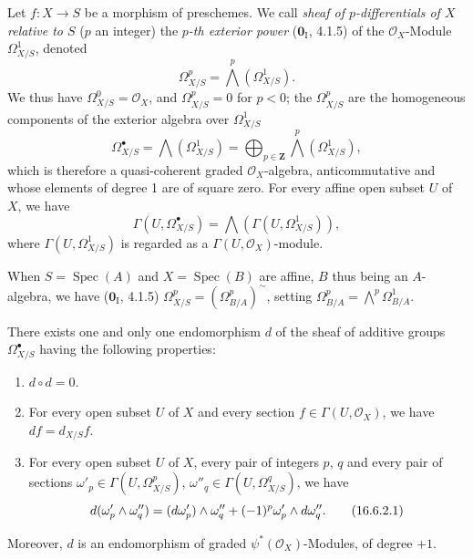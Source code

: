 \begin{env}[16.6.1]\label{IV.16.6.1}
Let $f:X\to S$ be a morphism of preschemes. We call \emph{sheaf of
$p$-differentials of $X$ relative to $S$} ($p$ an integer) the
\emph{$p$-th exterior power} ($\mathbf{0}_{\mathrm I}$, 4.1.5) of the $\mathcal{O}_X$-Module
$\varOmega_{X/S}^1$, denoted
\[
  \varOmega_{X/S}^p=\bigwedge^p(\varOmega_{X/S}^1).
  \tag{16.6.1.1}
  \label{IV.16.6.1.1}
\]
We thus have $\varOmega_{X/S}^0=\mathcal{O}_X$, and $\varOmega_{X/S}^p=0$ for $p<0$;
the $\varOmega_{X/S}^p$ are the homogeneous components of the exterior algebra
over $\varOmega_{X/S}^1$
\[
  \varOmega_{X/S}^{\bullet}=\bigwedge(\varOmega_{X/S}^1)
  =\bigoplus_{p\in\mathbf{Z}}\bigwedge^p(\varOmega_{X/S}^1),
  \tag{16.6.1.2}
  \label{IV.16.6.1.2}
\]
which is therefore a quasi-coherent graded $\mathcal{O}_X$-algebra,
anticommutative and whose elements of degree 1 are of square zero. For every
affine open subset $U$ of $X$, we have
\[
  \Gamma(U,\varOmega_{X/S}^{\bullet})
  =\bigwedge(\Gamma(U,\varOmega_{X/S}^1)),
\]
where $\Gamma(U,\varOmega_{X/S}^1)$ is regarded as a
$\Gamma(U,\mathcal{O}_X)$-module.

When $S=\operatorname{Spec}(A)$ and $X=\operatorname{Spec}(B)$ are
affine, $B$ thus being an $A$-algebra, we have ($\mathbf{0}_{\mathrm I}$, 4.1.5)
$\varOmega_{X/S}^p=(\Omega_{B/A}^p)^{\sim}$, setting
$\Omega_{B/A}^p=\bigwedge^p\Omega_{B/A}^1$.
\end{env}

\begin{theorem}[16.6.2]
\label{IV.16.6.2}
There exists one and only one endomorphism $d$ of the sheaf of additive groups
$\varOmega_{X/S}^{\bullet}$ having the following properties:
\begin{enumerate}
\item[\textup{(i)}] $d\circ d=0$.
\item[\textup{(ii)}] For every open subset $U$ of $X$ and every section
$f\in\Gamma(U,\mathcal{O}_X)$, we have $df=d_{X/S}f$.
\item[\textup{(iii)}] For every open subset $U$ of $X$, every pair of integers $p$, $q$
and every pair of sections
$\omega'_p\in\Gamma(U,\varOmega_{X/S}^p)$,
$\omega''_q\in\Gamma(U,\varOmega_{X/S}^q)$, we have
\[
  d(\omega'_p\wedge\omega''_q)
  =(d\omega'_p)\wedge\omega''_q
  +(- 1)^p\omega'_p\wedge d\omega''_q.
  \tag{16.6.2.1}
  \label{IV.16.6.2.1}
\]
\end{enumerate}
Moreover, $d$ is an endomorphism of graded $\psi^*(\mathcal{O}_X)$-Modules,
of degree $+1$.
\end{theorem}

